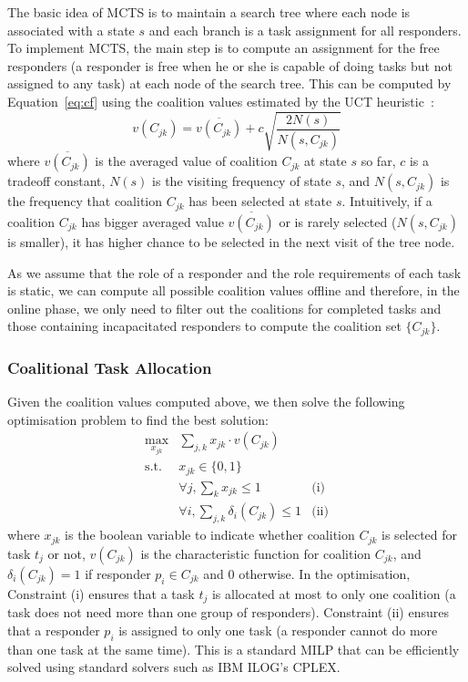 The basic idea of MCTS is to maintain a search tree where each node
is associated with a state $s$ and each branch is a task assignment
for all responders. To implement MCTS, the main step is to compute
an assignment for the free responders (a responder is free when he
or she is capable of doing tasks but not assigned to any task) at
each node of the search tree. This can be computed by
Equation~\ref{eq:cf} using the coalition values estimated by the
UCT heuristic~\cite{?}:
\begin{equation}
  v(C_{jk}) = \overline{v(C_{jk})} + c\sqrt{\frac{2N(s)}{N(s, C_{jk})}}
\end{equation}
where $\overline{v(C_{jk})}$ is the averaged value of coalition
$C_{jk}$ at state $s$ so far, $c$ is a tradeoff constant, $N(s)$ is
the visiting frequency of state $s$, and $N(s, C_{jk})$ is the
frequency that coalition $C_{jk}$ has been selected at state $s$.
Intuitively, if a coalition $C_{jk}$ has bigger averaged value
$\overline{v(C_{jk})}$ or is rarely selected ($N(s, C_{jk})$ is
smaller), it has higher chance to be selected in the next visit of
the tree node.

As we assume that the role of a responder and the role requirements
of each task is static, we can compute all possible coalition
values offline and therefore, in the online phase, we only need to
filter out the coalitions for completed tasks and those containing
incapacitated responders to compute the coalition set $\{ C_{jk}
\}$.

\subsubsection{Coalitional Task Allocation}
Given the coalition values computed above, we then solve the following
optimisation problem to find the best solution:
\begin{equation}
  \begin{array}{lll}
    \max\limits_{x_{jk}} & \sum_{j, k} x_{jk} \cdot v(C_{jk}) & \\[2pt]
    \mbox{s.t.} & x_{jk} \in \{0, 1\} & \\[2pt]
    & \forall j, \sum_{k} x_{jk} \leq 1 & \mbox{(i)} \\[2pt]
    & \forall i, \sum_{j, k} \delta_i(C_{jk}) \leq 1 & \mbox{(ii)}
  \end{array}
  \label{eq:cf}
\end{equation}
where $x_{jk}$ is the boolean variable to indicate whether
coalition $C_{jk}$ is selected for task $t_j$ or not, $v(C_{jk})$
is the characteristic function for coalition $C_{jk}$, and
$\delta_i(C_{jk}) = 1$ if responder $p_i\in C_{jk}$ and 0
otherwise. In the optimisation, Constraint (i) ensures that a task
$t_j$ is allocated at most to only one coalition (a task does not
need more than one group of responders). Constraint (ii) ensures
that a responder $p_i$ is assigned to only one task (a responder
cannot do more than one task at the same time). This is a standard
MILP that can be efficiently solved  using standard solvers such as
IBM ILOG's CPLEX.

